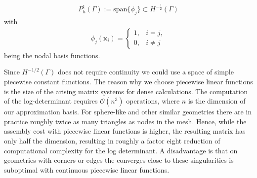 \begin{align*}
    P_{h}^{1}(\Gamma) := \text{span}\{\phi_{j}\} \subset H^{-\frac{1}{2}}(\Gamma)
\end{align*}
with 
\begin{align*}
    \phi_{j}(\boldsymbol{x}_{i}) = \begin{cases}
        1, & i = j,\\
        0, & i\neq j
    \end{cases}
\end{align*}
being the nodal basis functions.

\begin{remark}
Since $H^{-1/2}(\Gamma)$ does not require continuity we could use a space of simple piecewise constant functions. The reason why we choose piecewise linear functions is the size of the arising matrix systems for dense calculations. The computation of the log-determinant requires $\mathcal{O}(n^3)$ operations, where $n$ is the dimension of our approximation basis. For sphere-like and other similar geometries there are in practice roughly twice as many triangles as nodes in the mesh. Hence, while the assembly cost with piecewise linear functions is higher, the resulting matrix has only half the dimension, resulting in roughly a factor eight reduction of computational complexity for the log determinant. A disadvantage is that on geometries with corners or edges the converges close to these singularities is suboptimal with continuous piecewise linear functions.
\end{remark}

